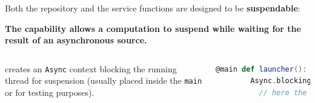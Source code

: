 \documentclass[aspectratio=1610,xcolor=dvipsnames]{beamer}
\begin{document}
\begin{frame}[fragile] %
  \small
  Both the repository and the service functions are designed to be \textbf{suspendable}:
  \begin{block}{}
    \textbf{The  capability allows a computation to suspend while waiting for the result of an asynchronous source.}
  \end{block}
  
  \pause
  \begin{columns}
       creates an \texttt{Async} context blocking the running thread for suspension (usually placed inside the \texttt{main} or for testing purposes).
    \begin{lstlisting}[language=scala,gobble=6]
      @main def launcher(): Unit =
        Async.blocking:
          // here the Async capability is available
    \end{lstlisting}
  \end{columns}
\end{frame}
%
\end{document}
